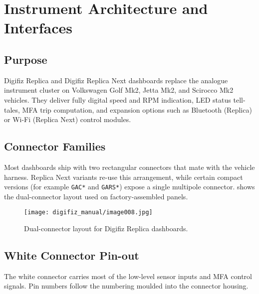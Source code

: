 \chapter{Instrument Architecture and Interfaces} \label{ch:Design}

\section{Purpose}

Digifiz Replica and Digifiz Replica Next dashboards replace the analogue instrument cluster on Volkswagen Golf Mk2, Jetta Mk2, and Scirocco Mk2 vehicles.
They deliver fully digital speed and RPM indication, LED status tell-tales, MFA trip computation, and expansion options such as Bluetooth (Replica) or Wi-Fi (Replica Next) control modules.

\section{Connector Families}

Most dashboards ship with two rectangular connectors that mate with the vehicle harness.
Replica Next variants re-use this arrangement, while certain compact versions (for example \texttt{GAC*} and \texttt{GARS*}) expose a single multipole connector.
 shows the dual-connector layout used on factory-assembled panels.

\begin{figure}[htbp]
    \centering
    \texttt{[image: digifiz\_manual/image008.jpg]}
    \caption{Dual-connector layout for Digifiz Replica dashboards.}
    \label{fig:dual-connector-layout}
\end{figure}

\section{White Connector Pin-out}

The white connector carries most of the low-level sensor inputs and MFA control signals.
Pin numbers follow the numbering moulded into the connector housing.

